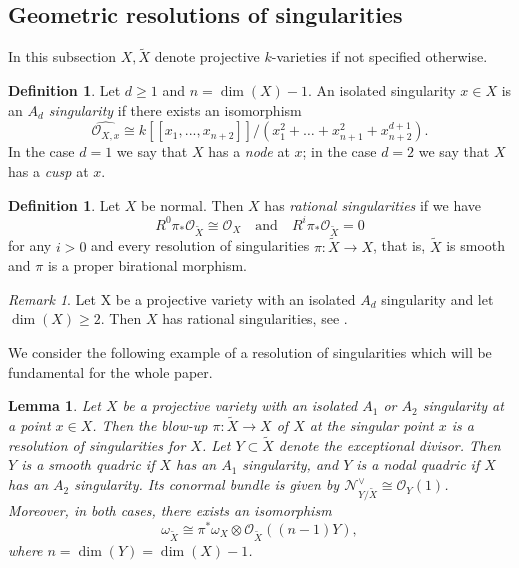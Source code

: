 \documentclass[a4paper, twoside, 11pt]{amsart}
\newtheorem{lemma}[theorem]{Lemma}
\theoremstyle{definition}
\newtheorem{definition}[theorem]{Definition}
\theoremstyle{remark}
\newtheorem{remark}[theorem]{Remark}
\numberwithin{equation}{theorem}
\begin{document}
\subsection{Geometric resolutions of singularities}
In this subsection $X,\widetilde{X}$ denote projective $k$-varieties if not specified otherwise. 
\begin{definition}\label{defi_A_d}
	Let $d \geq 1$ and $n = \dim(X)-1$. An isolated singularity $x \in X$ is an \textit{$A_d$ singularity} if there exists an isomorphism
	\begin{equation*}
		\widehat{\mathcal{O}_{X,x}} \cong k[[ x_1,...,x_{n+2}]]/({x_1^2+\dots+x_{n+1}^2+x_{n+2}^{d+1}}).
	\end{equation*}
	In the case $d=1$ we say that $X$ has a \textit{node} at $x$; in the case $d=2$ we say that $X$ has a \textit{cusp} at $x$.
\end{definition}
\begin{definition}
	Let $X$ be normal. Then $X$ has \textit{rational singularities} if we have 
	\begin{equation*}
		R^0\pi_*\mathcal{O}_{\widetilde{X}} \cong \mathcal{O}_X \quad \text{and} \quad R^i\pi_*\mathcal{O}_{\widetilde{X}} = 0 
	\end{equation*}
	for any $i>0$ and every resolution of singularities $\pi\colon \widetilde{X} \to X$, that is,  $\widetilde{X}$ is smooth and $\pi$ is a proper birational morphism. 
\end{definition}
\begin{remark}
    Let X be a projective variety with an isolated $A_d$ singularity and let $\dim(X) \geq 2$. Then $X$ has rational singularities, see \cite{Viehweg_rational}. 
\end{remark}
We consider the following example of a resolution of singularities which will be fundamental for the whole paper.
\begin{lemma}\label{blow_up}
	Let $X$ be a projective variety with an isolated $A_1$ or $A_2$ singularity at a point $x \in X$. Then the blow-up $\pi\colon \widetilde{X} \to X$ of $X$ at the singular point $x$ is a resolution of singularities for $X$. Let $Y\subset \widetilde{X}$ denote the exceptional divisor. Then $Y$ is a smooth quadric if $X$ has an $A_1$ singularity, and $Y$ is a nodal quadric if $X$ has an $A_2$ singularity. Its conormal bundle is given by $\mathcal{N}_{Y/\widetilde{X}}^\vee \cong \mathcal{O}_Y(1)$. Moreover, in both cases, there exists an isomorphism
    \begin{equation}\label{omega_X_tilde}
		\omega_{\widetilde{X}} \cong \pi^*\omega_{X} \otimes \mathcal{O}_{\widetilde{X}}((n-1)Y), 
	\end{equation}
    where $n = \dim(Y) = \dim(X) -1$. 
\end{lemma}
\end{document}
